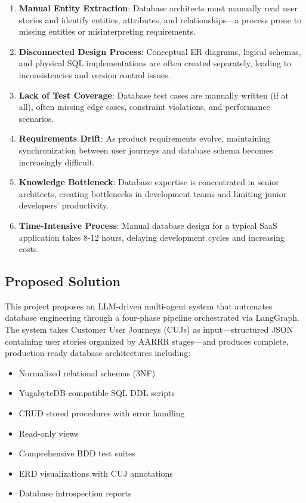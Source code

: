 \documentclass[12pt,a4paper]{article}
\begin{document}
\begin{enumerate}
\item \textbf{Manual Entity Extraction}: Database architects must manually read user stories and identify entities, attributes, and relationships—a process prone to missing entities or misinterpreting requirements.

\item \textbf{Disconnected Design Process}: Conceptual ER diagrams, logical schemas, and physical SQL implementations are often created separately, leading to inconsistencies and version control issues.

\item \textbf{Lack of Test Coverage}: Database test cases are manually written (if at all), often missing edge cases, constraint violations, and performance scenarios.

\item \textbf{Requirements Drift}: As product requirements evolve, maintaining synchronization between user journeys and database schema becomes increasingly difficult.

\item \textbf{Knowledge Bottleneck}: Database expertise is concentrated in senior architects, creating bottlenecks in development teams and limiting junior developers' productivity.

\item \textbf{Time-Intensive Process}: Manual database design for a typical SaaS application takes 8-12 hours, delaying development cycles and increasing costs.
\end{enumerate}

\subsection{Proposed Solution}

This project proposes an LLM-driven multi-agent system that automates database engineering through a four-phase pipeline orchestrated via LangGraph. The system takes Customer User Journeys (CUJs) as input—structured JSON containing user stories organized by AARRR stages—and produces complete, production-ready database architectures including:

\begin{itemize}
\item Normalized relational schemas (3NF)
\item YugabyteDB-compatible SQL DDL scripts
\item CRUD stored procedures with error handling
\item Read-only views
\item Comprehensive BDD test suites
\item ERD visualizations with CUJ annotations
\item Database introspection reports
\end{itemize}
\end{document}
